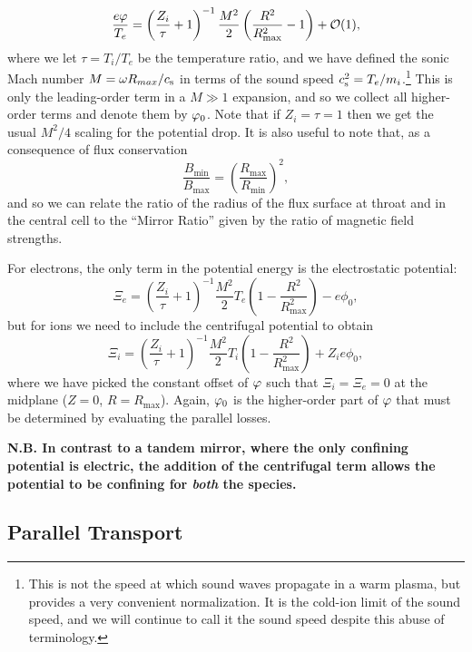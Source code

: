 \documentclass{revtex4-2}
\begin{document}
\begin{equation}
\frac{e \varphi}{T_e} = \left( \frac{Z_i}{\tau} + 1 \right)^{-1} \frac{M^2}{2} \left( \frac{R^2}{R_{\mathrm{max}}^2} - 1 \right) + \mathcal{O}(1),
\end{equation}
where we let $\tau = T_i/T_e$ be the temperature ratio, and we have defined the sonic Mach number $M = \omega R_{max} / c_{\mathrm{s}}$ in terms of the sound speed $c_{\mathrm{s}}^2 = T_e / m_i$.\footnote{This is not the speed at which sound waves propagate in a warm plasma, but provides a very convenient normalization. It is the cold-ion limit of the sound speed, and we will continue to call it the sound speed despite this abuse of terminology.}
This is only the leading-order term in a $M \gg 1$ expansion, and so we collect all higher-order terms and denote them by $\varphi_0$.
Note that if $Z_i = \tau = 1$ then we get the usual $M^2/4$ scaling for the potential drop. 
It is also useful to note that, as a consequence of flux conservation
	\begin{equation}
	\frac{B_{\mathrm{min}}}{B_{\mathrm{max}}} = \left(\frac{R_{\mathrm{max}}}{R_{\mathrm{min}}}\right)^2, 
\end{equation}
and so we can relate the ratio of the radius of the flux surface at throat and in the central cell to the ``Mirror Ratio'' given by the ratio of magnetic field strengths.

For electrons, the only term in the potential energy is the electrostatic potential:
\begin{equation}
\Xi_e = \left( \frac{Z_i}{\tau} + 1 \right)^{-1} \frac{M^2}{2} T_e \left( 1 - \frac{R^2}{R_{\mathrm{max}}^2} \right) - e \phi_0,
\end{equation}
but for ions we need to include the centrifugal potential to obtain
\begin{equation}
\Xi_i = \left( \frac{Z_i}{\tau} + 1 \right)^{-1} \frac{M^2}{2} T_i \left( 1 - \frac{R^2}{R_{\mathrm{max}}^2} \right) + Z_i e \phi_0,
\end{equation}
where we have picked the constant offset of $\varphi$ such that $\Xi_i = \Xi_e = 0$ at the midplane ($Z=0$, $R=R_{\mathrm{max}}$). Again, $\varphi_0$ is the higher-order part of $\varphi$ that must be determined by evaluating the parallel losses.

\textbf{N.B. In contrast to a tandem mirror, where the only confining potential is electric, the addition of the centrifugal term allows the 
	potential to be confining for \textit{both} the species.}

\subsection{Parallel Transport}
\end{document}
